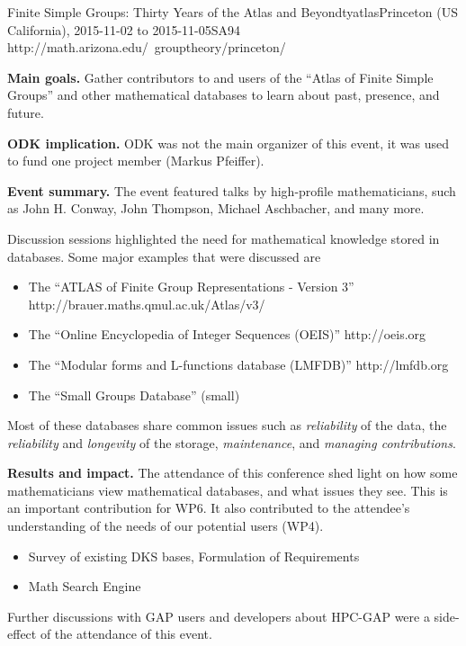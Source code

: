 \begin{event}{Finite Simple Groups: Thirty Years of the Atlas and
    Beyond}{tyatlas}{Princeton (US California), 2015-11-02 to 2015-11-05}{SA}{94
    }{http://math.arizona.edu/~grouptheory/princeton/}

\textbf{Main goals.} Gather contributors to and users of the ``Atlas of Finite
Simple Groups'' and other mathematical databases to learn about past, presence,
and future.

\textbf{ODK implication.} ODK was not the main organizer of this event, it was used to fund
one project member (Markus Pfeiffer).

\textbf{Event summary.} The event featured talks by high-profile mathematicians,
such as John H. Conway, John Thompson, Michael Aschbacher, and many more.

Discussion sessions highlighted the need for mathematical knowledge
stored in databases. Some major examples that were discussed are
\begin{itemize}
  \item The ``ATLAS of Finite Group Representations - Version 3''
    http://brauer.maths.qmul.ac.uk/Atlas/v3/
  \item The ``Online Encyclopedia of Integer Sequences (OEIS)''
    http://oeis.org
  \item The ``Modular forms and L-functions database (LMFDB)''
    http://lmfdb.org
  \item The ``Small Groups Database'' (small)
\end{itemize}

Most of these databases share common issues such as \emph{reliability} of the
data, the \emph{reliability} and \emph{longevity} of the storage,
\emph{maintenance}, and \emph{managing contributions}.
    
\textbf{Results and impact.} 
The attendance of this conference shed light on how some mathematicians view
mathematical databases, and what issues they see. This is an important
contribution for WP6. It also contributed to the attendee's understanding of the
needs of our potential users (WP4).

\begin{itemize}
\item {} Survey of existing DKS bases, Formulation of Requirements
\item {} Math Search Engine

\end{itemize}

Further discussions with GAP users and developers about HPC-GAP were a
side-effect of the attendance of this event. 

\end{event}